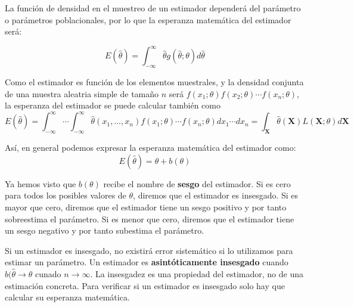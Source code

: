
La funci\'on de densidad en el muestreo de un estimador depender\'a del par\'ametro o par\'ametros poblacionales, por lo que la esperanza matem\'atica del estimador ser\'a:

\begin{equation*}
E(\hat{\theta})=\int_{-\infty}^{\infty}\hat{\theta}g(\hat{\theta};\theta)d\hat{\theta}
\end{equation*}

Como el estimador es funci\'on de los elementos muestrales, y la densidad conjunta de una muestra aleatria simple de tama\~no $n$ ser\'a $f(x_1;\theta)f(x_2;\theta)\cdots f(x_n;\theta)$, la esperanza del estimador se puede calcular tambi\'en como
\begin{equation*}
E(\hat{\theta})=\int_{-\infty}^{\infty}\cdots\int_{-\infty}^{\infty}\hat{\theta}(x_1,\ldots,x_n)f(x_1;\theta)\cdots f(x_n;\theta)dx_1\cdots dx_n=\int_{\boldsymbol{X}}\hat{\theta}(\boldsymbol{X})L(\boldsymbol{X};\theta)d\boldsymbol{X}
\end{equation*}

As\'i, en general podemos expresar la esperanza matem\'atica del estimador como:
\begin{equation*}
E(\hat{\theta})=\theta + b(\theta)
\end{equation*}

Ya hemos visto que $ b(\theta)$ recibe el nombre de \textbf{sesgo} del estimador. Si es cero para todos los posibles valores de $\theta$, diremos que el estimador es insesgado. Si es mayor que cero, diremos que el estimador tiene un sesgo positivo y por tanto sobreestima el par\'ametro. Si es menor que cero, diremos que el estimador tiene un sesgo negativo y por tanto subestima el par\'ametro.

Si un estimador es insesgado, no existir\'a error sistem\'atico si lo utilizamos para estimar un par\'ametro. Un estimador es \textbf{asint\'oticamente insesgado} cuando $b(\hat{\theta}\to\theta$ cunado $n\to\infty$. La insesgadez es una propiedad del estimador, no de una estimaci\'on concreta. Para verificar si un estimador es insesgado solo hay que calcular su esperanza matem\'atica.

